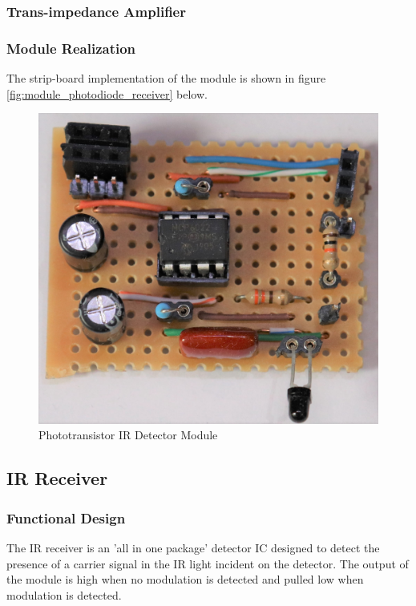 \subsubsection{Trans-impedance Amplifier}


\subsubsection{Module Realization}
The strip-board implementation of the module is shown in figure \ref{fig:module_photodiode_receiver} below.

\begin{figure}[H]
	\centering
	\includegraphics[width=.6\textwidth]{figures/modules/phototransistor_receiver.jpg}
	\caption{Phototransistor IR Detector Module}
	\label{fig:module_phototransistor_detector}
\end{figure}








\subsection{IR Receiver}

\subsubsection{Functional Design}
The IR receiver is an 'all in one package' detector IC designed to detect the presence of a carrier signal in the IR light incident on the detector. The output of the module is high when no modulation is detected and pulled low when modulation is detected.

